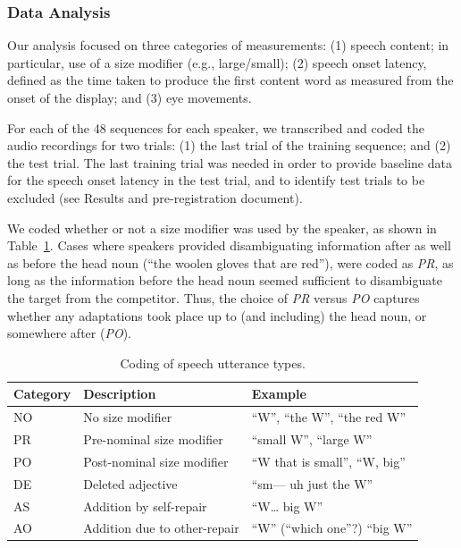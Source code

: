 \documentclass[natbib,doc,a4paper]{apa6}
\begin{document}
\subsubsection*{Data Analysis}
\label{sec:orgee18a34}

Our analysis focused on three categories of measurements: (1) speech content; in particular, use of a size modifier (e.g., large/small); (2) speech onset latency, defined as the time taken to produce the first content word as measured from the onset of the display; and (3) eye movements.

For each of the 48 sequences for each speaker, we transcribed and coded the audio recordings for two trials: (1) the last trial of the training sequence; and (2) the test trial. The last training trial was needed in order to provide baseline data for the speech onset latency in the test trial, and to identify test trials to be excluded (see Results and pre-registration document).

We coded whether or not a size modifier was used by the speaker, as shown in Table~\ref{tab:org8a87d88}. Cases where speakers provided disambiguating information after as well as before the head noun (``the woolen gloves that are red''), were coded as \emph{PR}, as long as the information before the head noun seemed sufficient to disambiguate the target from the competitor. Thus, the choice of \emph{PR} versus \emph{PO} captures whether any adaptations took place up to (and including) the head noun, or somewhere after (\emph{PO}).

\begin{table}[htbp]
\caption{\label{tab:org8a87d88}
Coding of speech utterance types.}
\centering
\begin{tabular}{lll}
\hline
Category & Description & Example\\
\hline
NO & No size modifier & ``W'', ``the W'', ``the red W''\\
PR & Pre-nominal size modifier & ``small W'', ``large W''\\
PO & Post-nominal size modifier & ``W that is small'', ``W, big''\\
DE & Deleted adjective & ``sm--- uh just the W''\\
AS & Addition by self-repair & ``W\ldots{} big W''\\
AO & Addition due to other-repair & ``W'' (``which one''?) ``big W''\\
\hline
\end{tabular}
\end{table}
\end{document}
